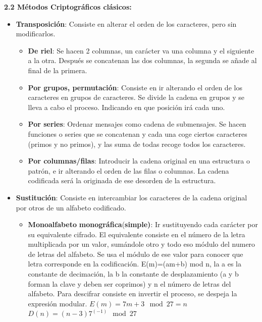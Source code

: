 \documentclass[12pt, twoside, openright]{report} %
\begin{document}
  \pagebreak
  \textbf{2.2 Métodos Criptográficos clásicos:}
  

  \begin{itemize}
  \item \textbf{Transposición}: Consiste en alterar el orden de los
    caracteres, pero sin modificarlos.
    

    \begin{itemize}
    \item \textbf{De riel}: Se hacen 2 columnas, un carácter va una columna
      y el siguiente a la otra. Después se concatenan las dos columnas,
      la segunda se añade al final de la primera.
      
    \item \textbf{Por grupos, permutación}: Consiste en ir alterando el
      orden de los caracteres en grupos de caracteres. Se divide la
      cadena en grupos y se lleva a cabo el proceso. Indicando en que
      posición irá cada uno.
      
    \item \textbf{Por series}: Ordenar mensajes como cadena de submensajes.
      Se hacen funciones o series que se concatenan y cada una coge
      ciertos caracteres (primos y no primos), y las suma de todas
      recoge todos los caracteres.
      
    \item \textbf{Por columnas/filas}: Introducir la cadena original en una
      estructura o patrón, e ir alterando el orden de las filas o
      columnas. La cadena codificada será la originada de ese desorden
      de la estructura.
      
    \end{itemize}
  \item \textbf{Sustitución}: Consiste en intercambiar los caracteres de la
    cadena original por otros de un alfabeto codificado.
    

    \begin{itemize}
    \item \textbf{Monoalfabeto} \textbf{monográfica}(\textbf{simple)}: Ir
      sustituyendo cada carácter por su equivalente cifrado. El
      equivalente consiste en el número de la letra multiplicada por un
      valor, sumándole otro y todo eso módulo del numero de letras del
      alfabeto. Se usa el módulo de ese valor para conocer que letra
      corresponde en la codificación. E(m)=(am+b) mod n, la a es la
      constante de decimación, la b la constante de desplazamiento (a y
      b forman la clave y deben ser coprimos) y n el número de letras
      del alfabeto. Para descifrar consiste en invertir el proceso, se
      despeja la expresión modular. $E(m)=7m+3 \mod 27=n$
      $D(n)=(n-3)7^{(-1)} \mod 27$
      


\end{itemize}
\end{itemize}
\end{document}
